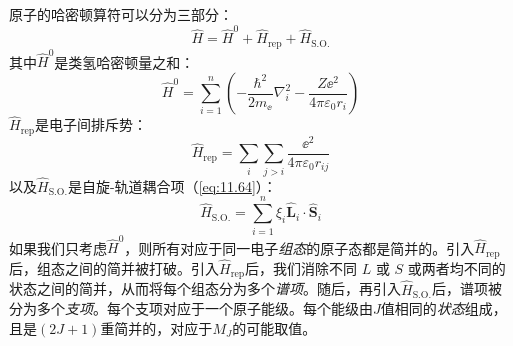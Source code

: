     原子的哈密顿算符可以分为三部分：
    \begin{equation}
        \hat{H} = \hat{H}^0 + \hat{H}_{\text{rep}} + \hat{H}_{\text{S.O.}}
        \label{eq:11.68}
    \end{equation}
    其中$\hat{H}^0$是类氢哈密顿量之和：
    \begin{equation}
        \hat{H}^0 = \sum_{i=1}^{n}\left(-\frac{\hbar^2}{2m_{\ee }}\nabla_i^2 - \frac{Z\ee ^2}{4\pi\varepsilon_0r_i}\right)
        \label{eq:11.69}
    \end{equation}
    $\hat{H}_{\text{rep}}$是电子间排斥势：
    \begin{equation}
        \hat{H}_{\text{rep}} = \sum_i \sum_{j>i} \frac{\ee ^2}{4\pi\varepsilon_0r_{ij}}
        \label{eq:11.70}
    \end{equation}
    以及$\hat{H}_{\text{S.O.}}$是自旋-轨道耦合项（\ref{eq:11.64}）：
    \begin{equation}
        \hat{H}_{\text{S.O.}} = \sum_{i=1}^{n} \xi_i \hat{\mathbf{L}}_i \cdot \hat{\mathbf{S}}_i
        \label{eq:11.71}
    \end{equation}
    如果我们只考虑$\hat{H}^0$，则所有对应于同一电子\textit{组态}的原子态都是简并的。引入$\hat{H}_{\text{rep}}$后，组态之间的简并被打破。引入$\hat{H}_{\text{rep}}$后，我们消除不同 $L$ 或 $S$ 或两者均不同的状态之间的简并，从而将每个组态分为多个\textit{谱项}。随后，再引入$\hat{H}_{\text{S.O.}}$后，谱项被分为多个\textit{支项}。每个支项对应于一个原子能级。每个能级由$J$值相同的\textit{状态}组成，且是$\left(2J+1\right)$重简并的，对应于$M_J$的可能取值。

